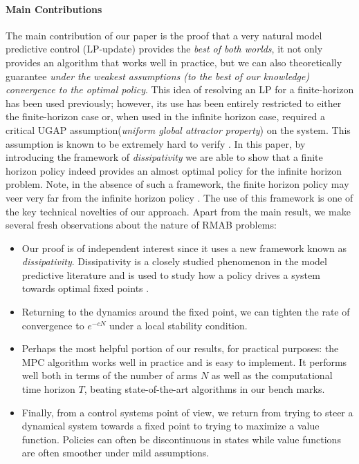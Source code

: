 \paragraph{Main Contributions}
The main contribution of our paper is the proof that a very natural model predictive control (LP-update) provides the \emph{best of both worlds}, it not only provides an algorithm that works well in practice, but we can also theoretically guarantee \emph{under the weakest assumptions (to the best of our knowledge) convergence to the optimal policy}. This idea of resolving an LP for a finite-horizon has been used previously; however, its use has been entirely restricted to either the finite-horizon case or, when used in the infinite horizon case, required a critical UGAP assumption(\emph{uniform global attractor property}) on the system. This assumption is known to be extremely hard to verify \cite{GGY23}. In this paper, by introducing the framework of \emph{dissipativity} we are able to show that a finite horizon policy indeed provides an almost optimal policy for the infinite horizon problem. Note, in the absence of such a framework, the finite horizon policy may veer very far from the infinite horizon policy \cite{DTGLS14}. The use of this framework is one of the key technical novelties of our approach. 
Apart from the main result, we make several fresh observations about the nature of RMAB problems:
\begin{itemize}[nosep]
    \item Our proof is of independent interest since it uses a new framework known as \emph{dissipativity}. Dissipativity is a closely studied phenomenon in the model predictive literature and is used to study how a policy drives a system towards optimal fixed points \citet{DTGLS14}. 
    \item Returning to the dynamics around the fixed point, we can tighten the rate of convergence to $e^{-cN}$ under a local stability condition.
    
    \item Perhaps the most helpful portion of our results, for practical purposes: the MPC algorithm works well in practice and is easy to implement. It performs well both in terms of the number of arms $N$ as well as the computational time horizon $T$, beating state-of-the-art algorithms in our bench marks. 
    \item Finally, from a control systems point of view, we return from trying to steer a dynamical system towards a fixed point to trying to maximize a value function. Policies can often be discontinuous in states while value functions are often smoother under mild assumptions.
\end{itemize}

